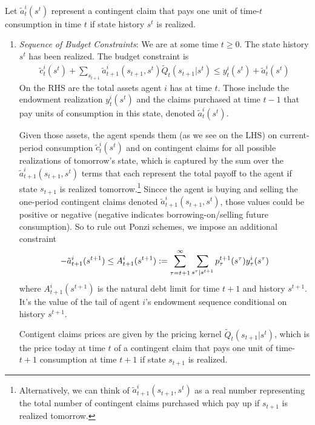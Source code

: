 \documentclass[12pt]{article}
\theoremstyle{plain}
\theoremstyle{definition}
\theoremstyle{remark}
\begin{document}
Let $\tilde{a}^i_t(s^t)$ represent a contingent claim that pays one unit
of time-$t$ consumption in time $t$ if state history $s^t$ is realized.
\begin{enumerate}
  \item \emph{Sequence of Budget Constraints}:
    We are at some time $t\geq 0$. The state history $s^t$ has been
    realized. The budget constraint is
    \begin{align*}
      \tilde{c}_t^i(s^t)
      + \sum_{s_{t+1}}
      \tilde{a}^i_{t+1}(s_{t+1},s^t)
      \tilde{Q}_t(s_{t+1}|s^t)
      \leq y^i_t(s^t) + \tilde{a}_t^i(s^t)
    \end{align*}
    On the RHS are the total assets agent $i$ has at time $t$. Those
    include the endowment realization $y^i_t(s^t)$ and the claims
    purchased at time $t-1$ that pay units of consumption in this state,
    denoted $\tilde{a}_t^i(s^t)$.

    Given those assets, the agent spends them (as we see on the LHS) on
    current-period consumption $\tilde{c}_t^i(s^t)$ and on contingent
    claims for all possible realizations of tomorrow's state, which is
    captured by the sum over the $\tilde{a}^i_{t+1}(s_{t+1},s^t)$ terms
    that each represent the total payoff to the agent if state $s_{t+1}$
    is realized tomorrow.\footnote{%
      Alternatively, we can think of $\tilde{a}^i_{t+1}(s_{t+1},s^t)$ as
      a real number representing the total number of contingent claims
      purchased which pay up if $s_{t+1}$ is realized tomorrow.
    }
    Sincce the agent is buying and selling the one-period contingent
    claims denoted $\tilde{a}^i_{t+1}(s_{t+1},s^t)$, those values could
    be positive or negative (negative indicates borrowing-on/selling
    future consumption). So to rule out Ponzi schemes, we impose an
    additional constraint
    \begin{align*}
      -\tilde{a}^i_{t+1}(s^{t+1}) \leq
      A^i_{t+1}(s^{t+1})
      :=
      \sum^\infty_{\vphantom{s^\tau|s^{t+1}}\tau = t+1} \sum_{s^\tau|s^{t+1}}
      p^{t+1}_\tau (s^\tau)y_\tau^i(s^\tau)
    \end{align*}
    where $A^i_{t+1}(s^{t+1})$ is the natural debt limit for time $t+1$
    and history $s^{t+1}$.
    It's the value of the tail of agent $i$'s endowment sequence
    conditional on history $s^{t+1}$.

    Contigent claims prices are given by the pricing kernel
    $\tilde{Q}_t(s_{t+1}|s^t)$, which is the price today at time $t$ of
    a contingent claim that pays one unit of time-$t+1$ consumption at
    time $t+1$ if state $s_{t+1}$ is realized.


\end{enumerate}







\end{document}
